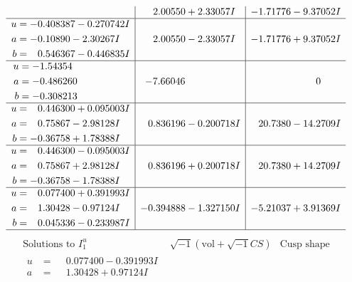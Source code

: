 \documentclass[1p]{elsarticle_modified}
\theoremstyle{definition}
\newcommand{\I}{\sqrt{-1}}
\begin{document}
$$\begin{array}{c|c|c}
 & \phantom{-}2.00550 + 2.33057 I & -1.71776 - 9.37052 I \\ \hline\begin{aligned}
u &= -0.408387 - 0.270742 I \\
a &= -0.10890 - 2.30267 I \\
b &= \phantom{-}0.546367 - 0.446835 I\end{aligned}
 & \phantom{-}2.00550 - 2.33057 I & -1.71776 + 9.37052 I \\ \hline\begin{aligned}
u &= -1.54354\phantom{ +0.000000I} \\
a &= -0.486260\phantom{ +0.000000I} \\
b &= -0.308213\phantom{ +0.000000I}\end{aligned}
 & -7.66046\phantom{ +0.000000I} & \phantom{-0.000000 } 0 \\ \hline\begin{aligned}
u &= \phantom{-}0.446300 + 0.095003 I \\
a &= \phantom{-}0.75867 - 2.98128 I \\
b &= -0.36758 + 1.78388 I\end{aligned}
 & \phantom{-}0.836196 - 0.200718 I & \phantom{-}20.7380 - 14.2709 I \\ \hline\begin{aligned}
u &= \phantom{-}0.446300 - 0.095003 I \\
a &= \phantom{-}0.75867 + 2.98128 I \\
b &= -0.36758 - 1.78388 I\end{aligned}
 & \phantom{-}0.836196 + 0.200718 I & \phantom{-}20.7380 + 14.2709 I \\ \hline\begin{aligned}
u &= \phantom{-}0.077400 + 0.391993 I \\
a &= \phantom{-}1.30428 - 0.97124 I \\
b &= \phantom{-}0.045336 - 0.233987 I\end{aligned}
 & -0.394888 - 1.327150 I & -5.21037 + 3.91369 I\\
 \hline 
 \end{array}$$\newpage$$\begin{array}{c|c|c}  
\text{Solutions to }I^u_{1}& \I (\text{vol} + \sqrt{-1}CS) & \text{Cusp shape}\\
 \hline 
\begin{aligned}
u &= \phantom{-}0.077400 - 0.391993 I \\
a &= \phantom{-}1.30428 + 0.97124 I \\

\end{aligned}
\end{array}$$
\end{document}
